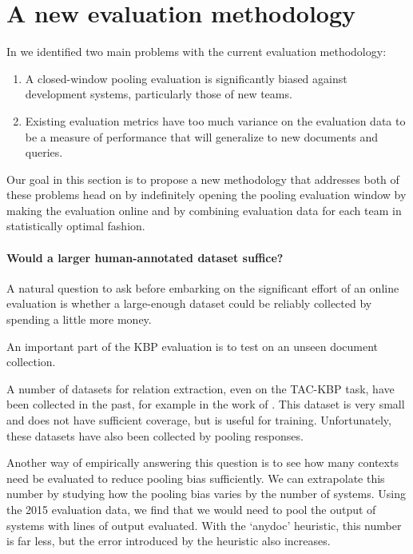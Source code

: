 \section{A new evaluation methodology}
\label{sec:methodology}

In  we identified two main problems with the current evaluation methodology:
\begin{enumerate}
  \item A closed-window pooling evaluation is significantly biased
    against development systems, particularly those of new teams.
  \item Existing evaluation metrics have too much variance on the
    evaluation data to be a measure of performance that will generalize
    to new documents and queries.
\end{enumerate}
Our goal in this section is to propose a new methodology that addresses both of these problems head on 
  by indefinitely opening the pooling evaluation window by making the evaluation online
  and by combining evaluation data for each team in statistically optimal fashion.

\paragraph{Would a larger human-annotated dataset suffice?}
A natural question to ask before embarking on the significant effort of an online evaluation is whether a large-enough dataset could be reliably collected by spending a little more money. 

An important part of the KBP evaluation is to test on an unseen document collection.

A number of datasets for relation extraction, even on the TAC-KBP task, have been collected in the past, for example in the work of \citet{angeli2014combining}.
This dataset is very small and does not have sufficient coverage, but is useful for training.
Unfortunately, these datasets have also been collected by pooling responses.

Another way of empirically answering this question is to see how many contexts need be evaluated to reduce pooling bias sufficiently. We can extrapolate this number by studying how the pooling bias varies by the number of systems.
Using the 2015 evaluation data, we find that we would need to pool the output of  systems with  lines of output evaluated.
With the `anydoc' heuristic, this number is far less, but the error introduced by the heuristic also increases.

